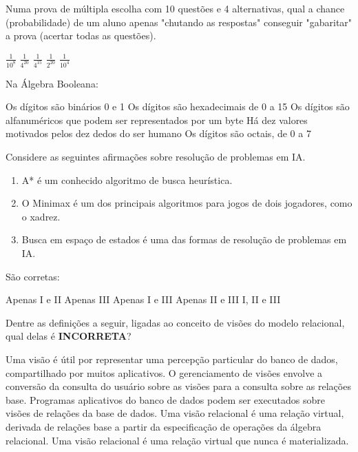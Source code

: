 \documentclass[12pt, addpoints]{exam}
\begin{document}
\begin{questions}
\question
Numa prova de múltipla escolha com 10 questões e 4 alternativas, qual a chance (probabilidade) de um aluno apenas "chutando as respostas" conseguir "gabaritar" a prova (acertar todas as questões).

\begin{choices}
\choice \( \frac{1}{10^{8}} \)
\choice \( \frac{1}{4^{20}} \)
\choice \( \frac{1}{4^{15}} \)
\choice \( \frac{1}{2^{20}} \)
\choice \( \frac{1}{10^{4}} \)
\end{choices}

\question
Na Álgebra Booleana:
\begin{choices}
\choice Os dígitos são binários 0 e 1
\choice Os dígitos são hexadecimais de 0 a 15
\choice Os dígitos são alfanuméricos que podem ser representados por um byte
\choice Há dez valores motivados pelos dez dedos do ser humano
\choice Os dígitos são octais, de 0 a 7
\end{choices}

\question
Considere as seguintes afirmações sobre resolução de problemas em IA.
\begin{enumerate}[label=\Roman*.]
    \item A* é um conhecido algoritmo de busca heurística.
    \item O Minimax é um dos principais algoritmos para jogos de dois jogadores, como o xadrez.
    \item Busca em espaço de estados é uma das formas de resolução de problemas em IA.
\end{enumerate}
São corretas:
\begin{choices}
\choice Apenas I e II
\choice Apenas III
\choice Apenas I e III
\choice Apenas II e III
\choice I, II e III
\end{choices}

\question
Dentre as definições a seguir, ligadas ao conceito de visões do modelo relacional, qual delas é \textbf{INCORRETA}?

\begin{choices}
\choice Uma visão é útil por representar uma percepção particular do banco de dados, compartilhado por muitos aplicativos.
\choice O gerenciamento de visões envolve a conversão da consulta do usuário sobre as visões para a consulta sobre as relações base.
\choice Programas aplicativos do banco de dados podem ser executados sobre visões de relações da base de dados.
\choice Uma visão relacional é uma relação virtual, derivada de relações base a partir da especificação de operações da álgebra relacional.
\choice Uma visão relacional é uma relação virtual que nunca é materializada.
\end{choices}


\end{questions}
\end{document}
